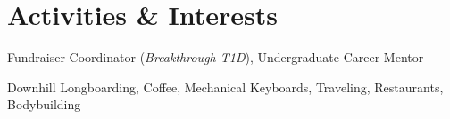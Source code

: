 \documentclass[letterpaper,11pt]{article}
\makeatletter
\newcommand{\resumeItem}[1]{
  \item\small{
    {#1 \vspace{-1pt}}
  }
}
\newcommand{\resumeProjectHeading}[2]{
    \item
    \begin{tabular*}{1.00\textwidth}{l@{\extracolsep{\fill}}r}
      \small#1 & \small{#2} \\
    \end{tabular*}\vspace{-7pt}
}
\newcommand{\resumeSubHeadingListStart}{\begin{itemize}[leftmargin=0in, label={}]\vspace{-3pt}}
\newcommand{\resumeSubHeadingListEnd}{\end{itemize}}
\newcommand{\resumeItemListStart}{\begin{itemize}
[leftmargin=0.2in]}
\newcommand{\resumeItemListEnd}{\end{itemize}}
\makeatother
\begin{document}

\section{Activities \& Interests}
 \begin{description}[leftmargin=!,labelwidth=\widthof{\small\textit{Activities:XXX}}, itemsep=0.5pt, parsep=0.5pt]
  \small
  \item[Activities:] Fundraiser Coordinator (\textit{Breakthrough T1D}), Undergraduate Career Mentor
  \item[Interests:] Downhill Longboarding, Coffee, Mechanical Keyboards, Traveling, Restaurants, Bodybuilding
\end{description}
\vspace{-10pt}

\end{document}
